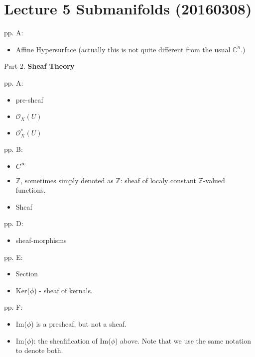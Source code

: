 \section{Lecture 5 Submanifolds (20160308)}

pp. A:
    \begin{itemize}
        \item Affine Hypersurface (actually this is not quite different from the usual $\mathbb{C}^n$.)
    \end{itemize}
	
Part 2. \textbf{Sheaf Theory}

pp. A:
	\begin{itemize}
		\item pre-sheaf
		\item $\mathcal{O}_X(U)$
		\item $\mathcal{O}^*_X(U)$
	\end{itemize}
pp. B:
	\begin{itemize}
		\item $C^{\infty}$
		\item $\mathbb{\underline{Z}}$, sometimes simply denoted as $\mathbb{Z}$: sheaf of localy constant $\mathbb{Z}$-valued functions.
		\item Sheaf
	\end{itemize}
pp. D:
	\begin{itemize}
		\item sheaf-morphisms
	\end{itemize}
pp. E:
	\begin{itemize}
		\item Section
		\item Ker($\phi$) - sheaf of kernals.
	\end{itemize}
pp. F:
	\begin{itemize}
		\item Im($\phi$) is a presheaf, but not a sheaf.
		\item Im($\phi$): the sheafification of Im($\phi$) above. Note that we use the same notation to denote both.
	\end{itemize}
	
